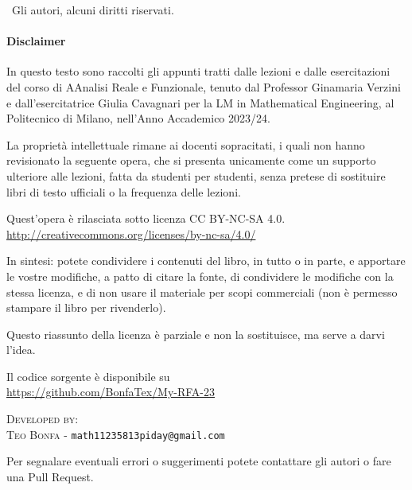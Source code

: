
\textcopyright \ Gli autori, alcuni diritti riservati.

\paragraph{Disclaimer} In questo testo sono raccolti gli appunti tratti dalle lezioni e dalle esercitazioni del corso di AAnalisi Reale e Funzionale, tenuto dal Professor Ginamaria Verzini e dall'esercitatrice Giulia Cavagnari per la LM in Mathematical Engineering, al Politecnico di Milano, nell'Anno Accademico 2023/24.

La proprietà intellettuale rimane ai docenti sopracitati, i quali non hanno revisionato la seguente opera, che si presenta unicamente come un supporto ulteriore alle lezioni, fatta da studenti per studenti, senza pretese di sostituire libri di testo ufficiali o la frequenza delle lezioni.


Quest'opera è rilasciata sotto licenza CC BY-NC-SA 4.0.\\
\url{http://creativecommons.org/licenses/by-nc-sa/4.0/}

In sintesi: potete condividere i contenuti del libro, in tutto o in parte, e apportare le vostre modifiche, a patto di citare la fonte, di condividere le modifiche con la stessa licenza, e di non usare il materiale per scopi commerciali (non è permesso stampare il libro per rivenderlo).

Questo riassunto della licenza è parziale e non la sostituisce, ma serve a darvi l'idea.


Il codice sorgente \latex è disponibile su \\
\url{https://github.com/BonfaTex/My-RFA-23}


\textsc{Developed by:}\\
\textsc{Teo Bonfa} - \texttt{math11235813piday@gmail.com}

Per segnalare eventuali errori o suggerimenti potete contattare gli autori o fare una Pull Request.

